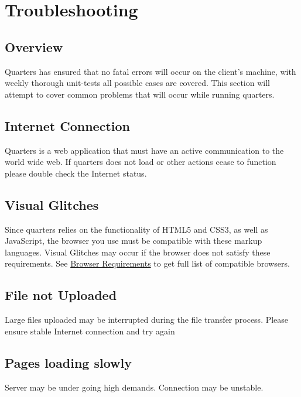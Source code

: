 \documentclass[12pt]{article}
\begin{document}
    \section{Troubleshooting}

    \subsection{Overview}
    Quarters has ensured that no fatal errors will occur on the client's machine, with weekly thorough unit-tests all possible cases are covered. This section will attempt to cover common problems that will occur while running quarters.

    \subsection{Internet Connection}
    Quarters is a web application that must have an active communication to the world wide web. If quarters does not load or other actions cease to function please double check the Internet status.

    \subsection{Visual Glitches}
    Since quarters relies on the functionality of HTML5 and CSS3, as well as JavaScript, the browser you use must be compatible with these markup languages. Visual Glitches may occur if the browser does not satisfy these requirements. See \hyperref[sec:browserRequirement]{Browser Requirements} to get full list of compatible browsers.

    \subsection{File not Uploaded}
    Large files uploaded may be interrupted during the file transfer process. Please ensure stable Internet connection and try again

    \subsection{Pages loading slowly}
    Server may be under going high demands. Connection may be unstable.

\end{document}
